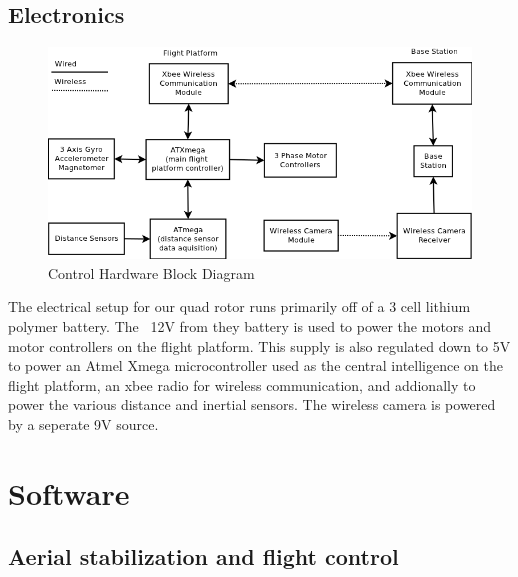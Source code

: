 \documentclass[12pt,letterpaper]{article}
\begin{document}
\subsection*{Electronics}

\begin{figure}[h!]
\caption{Control Hardware Block Diagram}
\includegraphics[width=6in]{controlhardware.png}
\end{figure}

The electrical setup for our quad rotor runs primarily off of a 3 cell
lithium polymer battery. The ~12V from they battery is used to power the motors
and motor controllers on the flight platform. This supply is also regulated down
to 5V to power an Atmel Xmega microcontroller used as the central intelligence
on the flight platform, an xbee radio for wireless communication, and
addionally to power the various distance and inertial sensors. 
The wireless camera is powered by a seperate 9V source.


\section*{Software}

\subsection*{Aerial stabilization and flight control}

\end{document}

